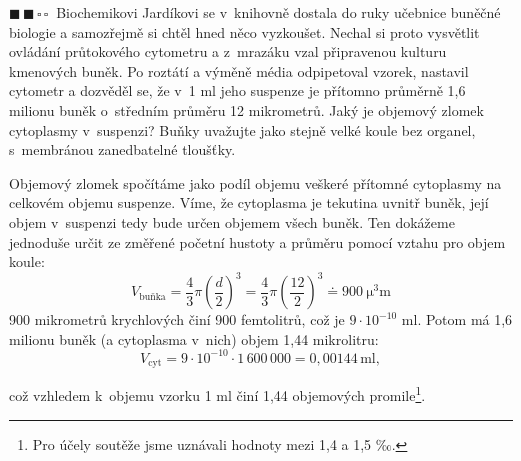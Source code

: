 \documentclass{book}
\newcommand{\dva}{$\blacksquare \, \blacksquare \, \square \, \square \; \; $}
\renewenvironment{quotation}{\par}{\par} %
\begin{document}
\hrulefill %
\begin{quotation}
\dva Biochemikovi Jardíkovi se v~knihovně dostala do ruky učebnice buněčné
biologie a samozřejmě si chtěl hned něco vyzkoušet. Nechal si proto
vysvětlit ovládání průtokového cytometru a z~mrazáku vzal připravenou
kulturu kmenových buněk. Po roztátí a výměně média odpipetoval vzorek,
nastavil cytometr a dozvěděl se, že v~1 ml jeho suspenze je přítomno průměrně
1,6 milionu buněk o~středním průměru 12 mikrometrů. Jaký je objemový
zlomek cytoplasmy v~suspenzi? Buňky uvažujte jako stejně velké koule
bez organel, s~membránou zanedbatelné tloušťky.
\end{quotation} \dotfill \par 
Objemový zlomek spočítáme jako podíl objemu veškeré přítomné cytoplasmy na celkovém objemu suspenze. Víme, že cytoplasma je tekutina uvnitř buněk, její objem v~suspenzi tedy bude určen objemem všech buněk. Ten dokážeme jednoduše určit ze změřené početní hustoty a průměru pomocí vztahu pro objem koule:
\[
V_{\mathrm{buňka}} = \frac{4}{3} \pi \left( \frac{d}{2} \right) ^3 = \frac{4}{3} \pi \left( \frac{12}{2} \right) ^3 \doteq \SI{900}{\cubic\micro\metre}
\]
 900 mikrometrů krychlových činí 900 femtolitrů, což je $9\cdot10^{-10}$ ml. Potom má 1,6 milionu buněk (a cytoplasma v~nich) objem 1,44 mikrolitru:
\[
V_{\mathrm{cyt}} = 9\cdot10^{-10} \cdot 1\, 600\, 000 = 0,00144 \, \mathrm{ml} ,
\]

což vzhledem k~objemu vzorku 1 ml činí 1,44 objemových promile\footnote{Pro účely soutěže jsme uznávali hodnoty mezi 1,4 a 1,5 ‰.}.
\end{document}
